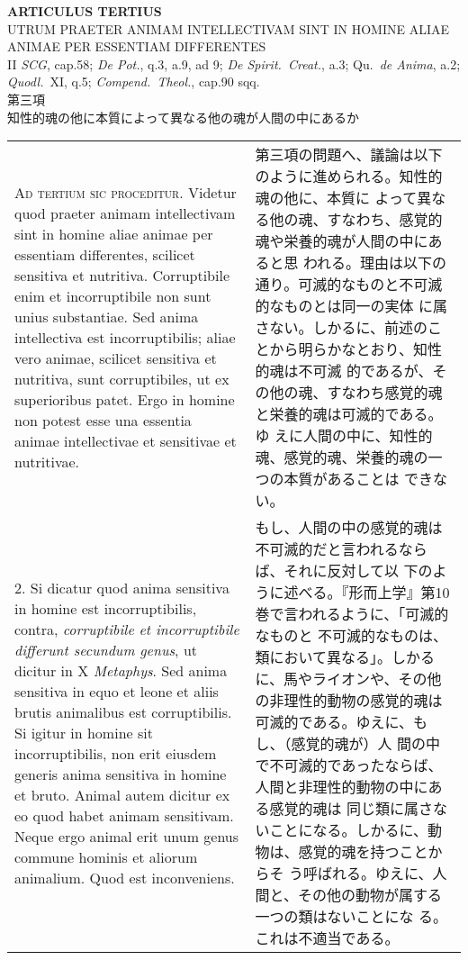\documentclass[paper=a4paper,fontsize=10pt,jafontsize=9pt,titlepage]{jlreq}
\begin{document}
\begin{center}
{\Large {\bfseries ARTICULUS TERTIUS}}\\
{\large UTRUM PRAETER ANIMAM INTELLECTIVAM SINT IN HOMINE ALIAE ANIMAE PER ESSENTIAM DIFFERENTES}\\
{\footnotesize II {\itshape SCG}, cap.58; {\itshape De Pot.}, q.3, a.9, ad 9; {\itshape De Spirit.~Creat.}, a.3; Qu.~{\itshape de Anima}, a.2; {\itshape Quodl.}~XI, q.5; {\itshape Compend.~Theol.}, cap.90 sqq.}\\
{\Large 第三項\\知性的魂の他に本質によって異なる他の魂が人間の中にあるか}
\end{center}

\begin{longtable}{p{21em}p{21em}}
{\scshape Ad tertium sic proceditur}. Videtur quod praeter animam
intellectivam sint in homine aliae animae per essentiam differentes,
scilicet sensitiva et nutritiva. Corruptibile enim et incorruptibile
non sunt unius substantiae. Sed anima intellectiva est
incorruptibilis; aliae vero animae, scilicet sensitiva et nutritiva,
sunt corruptibiles, ut ex superioribus patet. Ergo in homine non
potest esse una essentia animae intellectivae et sensitivae et
nutritivae.

&

 第三項の問題へ、議論は以下のように進められる。知性的魂の他に、本質に
 よって異なる他の魂、すなわち、感覚的魂や栄養的魂が人間の中にあると思
 われる。理由は以下の通り。可滅的なものと不可滅的なものとは同一の実体
 に属さない。しかるに、前述のことから明らかなとおり、知性的魂は不可滅
 的であるが、その他の魂、すなわち感覚的魂と栄養的魂は可滅的である。ゆ
 えに人間の中に、知性的魂、感覚的魂、栄養的魂の一つの本質があることは
 できない。 
 
\\



2. Si dicatur quod anima sensitiva in homine est incorruptibilis,
contra, {\itshape corruptibile et incorruptibile differunt secundum
genus}, ut dicitur in X {\itshape Metaphys}. Sed anima sensitiva in
equo et leone et aliis brutis animalibus est corruptibilis. Si igitur
in homine sit incorruptibilis, non erit eiusdem generis anima
sensitiva in homine et bruto. Animal autem dicitur ex eo quod habet
animam sensitivam. Neque ergo animal erit unum genus commune hominis
et aliorum animalium. Quod est inconveniens.

&

もし、人間の中の感覚的魂は不可滅的だと言われるならば、それに反対して以
下のように述べる。『形而上学』第10巻で言われるように、「可滅的なものと
不可滅的なものは、類において異なる」。しかるに、馬やライオンや、その他
の非理性的動物の感覚的魂は可滅的である。ゆえに、もし、（感覚的魂が）人
間の中で不可滅的であったならば、人間と非理性的動物の中にある感覚的魂は
同じ類に属さないことになる。しかるに、動物は、感覚的魂を持つことからそ
う呼ばれる。ゆえに、人間と、その他の動物が属する一つの類はないことにな
る。これは不適当である。
 

\end{longtable}
\end{document}
